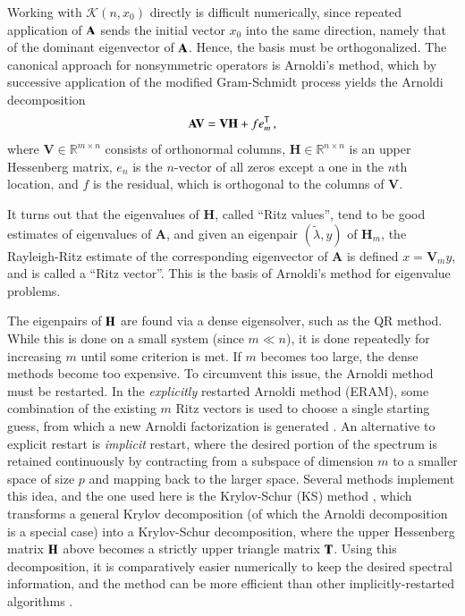 Working with $\mathcal{K}(n, x_0)$ directly is difficult numerically, since
repeated application of $\mathbf{A}$ sends the initial vector $x_0$ into the
same direction, namely that of the dominant eigenvector of $\mathbf{A}$.  
Hence, the basis 
must be orthogonalized. The canonical approach for nonsymmetric 
operators is Arnoldi's method, which by successive application of the 
modified Gram-Schmidt process yields the Arnoldi decomposition
\begin{equation}
 \mathbf{A}\mathbf{V} = \mathbf{V} \mathbf{H} + fe^{\mathsf{T}}_m \, ,
\end{equation}
where $\mathbf{V} \in \mathbb{R}^{m\times n}$  consists of
orthonormal columns,
$\mathbf{H} \in \mathbb{R}^{n \times n} $ is an upper Hessenberg matrix, 
$e_n$ is the
$n$-vector of all zeros except a one in the $n$th location, and $f$ is 
the residual, which is orthogonal to the columns of $\mathbf{V}$.  

It turns out that the eigenvalues of $\mathbf{H}$, called ``Ritz values'', tend to
be good estimates of eigenvalues of $\mathbf{A}$, and given an eigenpair
$(\tilde{\lambda}, y)$ of $\mathbf{H}_m$, the Rayleigh-Ritz estimate of the
corresponding eigenvector of $\mathbf{A}$ is defined $x = \mathbf{V}_m y$, and
is called a ``Ritz vector''.  This is the basis of Arnoldi's method for 
eigenvalue problems.

The eigenpairs of $\mathbf{H}$ are found via a dense eigensolver, such as 
the QR method.  While this is done on a small system (since $m \ll n$), 
it is done repeatedly for increasing $m$ until some criterion is met.  
If $m$ becomes too large, the dense methods become too expensive.  To 
circumvent this issue, the Arnoldi method must be restarted.  In 
the {\it explicitly} restarted Arnoldi method (ERAM), some combination of 
the existing $m$ Ritz vectors is used to choose a single starting guess, 
from which a new Arnoldi factorization is generated \cite{slepc}.
An alternative to explicit restart is {\it implicit} restart, where the 
desired portion of the spectrum is retained continuously by contracting 
from a subspace of dimension $m$ to a smaller space of size $p$ and mapping 
back to the larger space. 
Several methods implement this idea, and the one used here 
is the Krylov-Schur (KS) method
\cite{stewart2002ksa}, which transforms a general Krylov decomposition 
(of which the Arnoldi decomposition is a special case) into a Krylov-Schur 
decomposition, where the upper Hessenberg matrix $\mathbf{H}$ 
above becomes a strictly upper triangle matrix $\mathbf{T}$.  
Using this decomposition, it is comparatively
easier numerically to keep the desired spectral information, and the 
method can be more efficient than other implicitly-restarted 
algorithms \cite{slepc}. 

